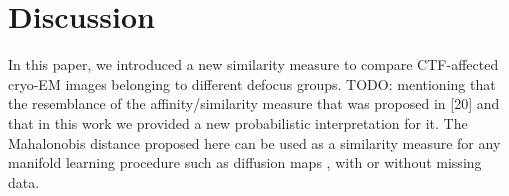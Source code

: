 \documentclass{article}
\begin{document}
\section{Discussion}
In this paper, we introduced a new similarity measure to compare CTF-affected cryo-EM images belonging to different defocus groups. {\color{red} TODO: mentioning that the resemblance of the affinity/similarity measure that was proposed in [20] and that in this work we provided a new probabilistic interpretation for it. }
The Mahalonobis distance proposed here can be used as a similarity measure for any manifold learning procedure \cite{intgeom, nlica} such as diffusion maps \cite{vdm, difmap}, with or without missing data.



\end{document}
